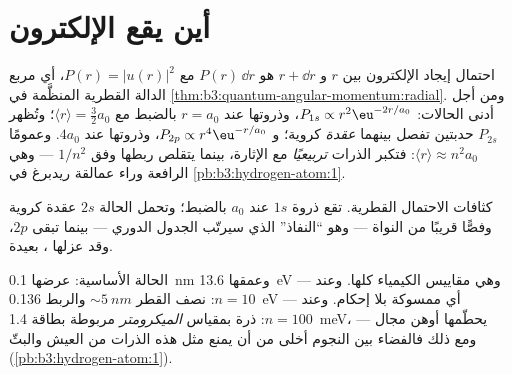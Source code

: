 \section{أين يقع الإلكترون}

\begin{proposition}\label{prop:b3:hydrogen-atom:radial}
احتمال إيجاد الإلكترون بين $r$ و $r + \dd r$
هو $P(r)\,\dd r$ مع $P(r) = |u(r)|^2$، أي مربع
الدالة القطرية المنظَّمة في \cref{thm:b3:quantum-angular-momentum:radial}. ومن أجل أدنى الحالات:
$P_{1s} \propto r^2\eu^{-2r/a_0}$، وذروتها عند $r = a_0$ بالضبط مع
$\langle r\rangle = \tfrac32 a_0$؛ وتُظهر $P_{2s}$ حدبتين
تفصل بينهما \emph{عقدة} كروية؛ و $P_{2p} \propto
r^4\eu^{-r/a_0}$، وذروتها عند $4a_0$. وعمومًا $\langle r\rangle
\approx n^2a_0$: فتكبر الذرات \emph{تربيعيًا} مع الإثارة،
بينما يتقلص ربطها وفق $1/n^2$ --- وهي الرافعة وراء
عمالقة ريدبرغ في \cref{pb:b3:hydrogen-atom:1}.
\end{proposition}
\admitted

\begin{omfigure}

{\small كثافات الاحتمال القطرية. تقع ذروة $1s$ عند
$a_0$ بالضبط؛ وتحمل الحالة $2s$ عقدة كروية وفصًّا قريبًا من
النواة --- وهو ``النفاذ'' الذي سيرتّب الجدول الدوري ---
بينما تبقى $2p$، وقد عزلها ،
بعيدة.}
\end{omfigure}

\begin{example}\label{ex:b3:hydrogen-atom:sizes}
الحالة الأساسية: عرضها \qty{0.1}{nm} وعمقها \qty{13.6}{eV} --- وهي
مقاييس الكيمياء كلها. وعند $n = 10$: نصف القطر $\sim\qty{5}{nm}$
والربط \qty{0.136}{eV} --- أي ممسوكة بلا إحكام. وعند $n = 100$: ذرة
بمقياس \emph{الميكرومتر} مربوطة بطاقة \qty{1.4}{meV}، يحطّمها
أوهن مجال --- ومع ذلك فالفضاء بين النجوم أخلى من أن يمنع مثل هذه
الذرات من العيش والبثّ
(\cref{pb:b3:hydrogen-atom:1}).
\end{example}

